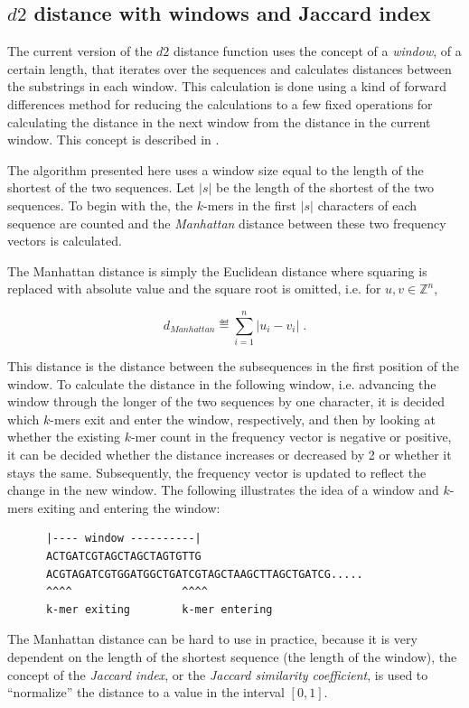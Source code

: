 \subsection{$d2$ distance with windows and Jaccard index}
The current version of the $d2$ distance function uses the concept of a
\emph{window}, of a certain length, that iterates over the sequences and
calculates distances between the substrings in each window. This calculation is
done using a kind of forward differences method for reducing the calculations
to a few fixed operations for calculating the distance in the next window from
the distance in the current window. This concept is described in
\cite{hazelhurst}.

The algorithm presented here uses a window size equal to the length of the
shortest of the two sequences. Let $|s|$ be the length of the shortest of the
two sequences. To begin with the, the $k$-mers in the first $|s|$ characters of
each sequence are counted and the \emph{Manhattan} distance between these two
frequency vectors is calculated.

The Manhattan distance is simply the Euclidean distance where squaring is
replaced with absolute value and the square root is omitted, i.e. for
$u, v \in \mathbb{Z}^n$,

\begin{equation}
  d_{Manhattan} \eqdef \sum_{i=1}^{n} |u_i - v_i| \;.
\end{equation}

This distance is the distance between the subsequences in the first position of
the window. To calculate the distance in the following window, i.e. advancing
the window through the longer of the two sequences by one character, it is
decided which $k$-mers exit and enter the window, respectively, and then by
looking at whether the existing $k$-mer count in the frequency vector is
negative or positive, it can be decided whether the distance increases or
decreased by 2 or whether it stays the same. Subsequently, the frequency vector
is updated to reflect the change in the new window. The following illustrates
the idea of a window and $k$-mers exiting and entering the window:

\begin{verbatim}
      |---- window ----------|
      ACTGATCGTAGCTAGCTAGTGTTG
      ACGTAGATCGTGGATGGCTGATCGTAGCTAAGCTTAGCTGATCG.....
      ^^^^                 ^^^^
      k-mer exiting        k-mer entering
\end{verbatim}

The Manhattan distance can be hard to use in practice, because it is very
dependent on the length of the shortest sequence (the length of the window),
the concept of the \emph{Jaccard index}, or the \emph{Jaccard similarity
coefficient}, is used to ``normalize'' the distance to a value in the interval
$[0,1]$.

